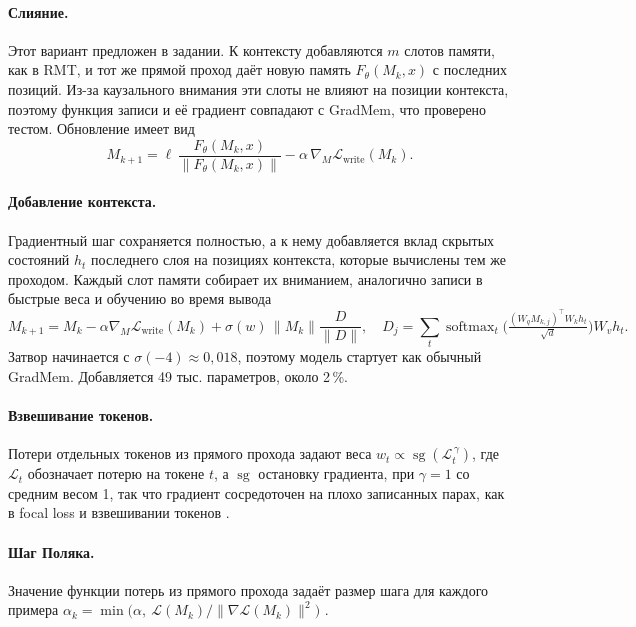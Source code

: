 \documentclass[a4paper,11pt]{article}
\newcommand{\cm}{\mathcal{L}}
\begin{document}
\paragraph{Слияние.} Этот вариант предложен в задании. К контексту добавляются $m$ слотов памяти, как в RMT, и тот же прямой проход даёт новую память $F_\theta(M_k,x)$ с последних позиций. Из-за каузального внимания эти слоты не влияют на позиции контекста, поэтому функция записи и её градиент совпадают с GradMem, что проверено тестом. Обновление имеет вид
\begin{equation}
M_{k+1} = \ell\,\frac{F_\theta(M_k,x)}{\lVert F_\theta(M_k,x)\rVert} - \alpha\,\nabla_M\cm_{\text{write}}(M_k). \label{eq:fused}
\end{equation}

\paragraph{Добавление контекста.} Градиентный шаг сохраняется полностью, а к нему добавляется вклад скрытых состояний $h_t$ последнего слоя на позициях контекста, которые вычислены тем же проходом. Каждый слот памяти собирает их вниманием, аналогично записи в быстрые веса \cite{fastweights} и обучению во время вывода \cite{ttt}
\begin{equation}
M_{k+1} = M_k - \alpha\nabla_M\cm_{\text{write}}(M_k) + \sigma(w)\,\lVert M_k\rVert\frac{D}{\lVert D\rVert}, \quad D_j = \sum_t \operatorname{softmax}_t\!\Big(\tfrac{(W_q M_{k,j})^{\top} W_k h_t}{\sqrt d}\Big) W_v h_t. \label{eq:ctx}
\end{equation}
Затвор начинается с $\sigma(-4)\approx 0{,}018$, поэтому модель стартует как обычный GradMem. Добавляется 49 тыс. параметров, около 2\,\%.

\paragraph{Взвешивание токенов.} Потери отдельных токенов из прямого прохода задают веса $w_t \propto \operatorname{sg}(\cm_t^{\,\gamma})$, где $\cm_t$ обозначает потерю на токене $t$, а $\operatorname{sg}$ остановку градиента, при $\gamma=1$ со средним весом 1, так что градиент сосредоточен на плохо записанных парах, как в focal loss \cite{focal} и взвешивании токенов \cite{tokenweight}.

\paragraph{Шаг Поляка.} Значение функции потерь из прямого прохода задаёт размер шага для каждого примера $\alpha_k=\min\big(\alpha,\ \cm(M_k)/\lVert\nabla\cm(M_k)\rVert^2\big)$ \cite{polyak,sps}.
\end{document}
